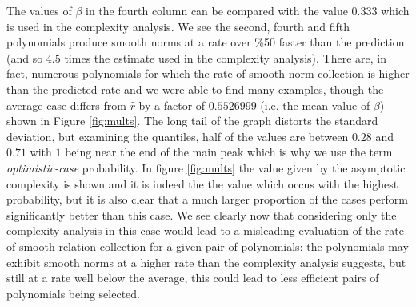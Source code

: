\documentclass[a4paper, 12pt, envcountsect, runningheads]{llncs}
\numberwithin{figure}{section}
\numberwithin{equation}{section}
\begin{document}
The values of $\beta$ in the fourth column can be compared with the value $0.33\hat{3}$ which is used in the complexity analysis. We see the second, fourth and fifth polynomials produce smooth norms at a rate over \%50 faster than the prediction (and so $4.5$ times the estimate used in the complexity analysis). There are, in fact, numerous polynomials for which the rate of smooth norm collection is higher than the predicted rate and we were able to find many examples, though the average case differs from $\hat{r}$ by a factor of $0.5526999$ (i.e. the mean value of $\beta$) shown in Figure \ref{fig:mults}. The long tail of the graph distorts the standard deviation, but examining the quantiles, half of the values are between $0.28$ and $0.71$ with $1$ being near the end of the main peak which is why we use the term {\em optimistic-case} probability. In figure \ref{fig:mults} the value given by the asymptotic complexity is shown and it is indeed the the value which occus with the highest probability, but it is also clear that a much larger proportion of the cases perform significantly better than this case. We see clearly now that considering only the complexity analysis in this case would lead to a misleading evaluation of the rate of smooth relation collection for a given pair of polynomials: the polynomials may exhibit smooth norms at a higher rate than the complexity analysis suggests, but still at a rate well below the average, this could lead to less efficient pairs of polynomials being selected.
\end{document}
